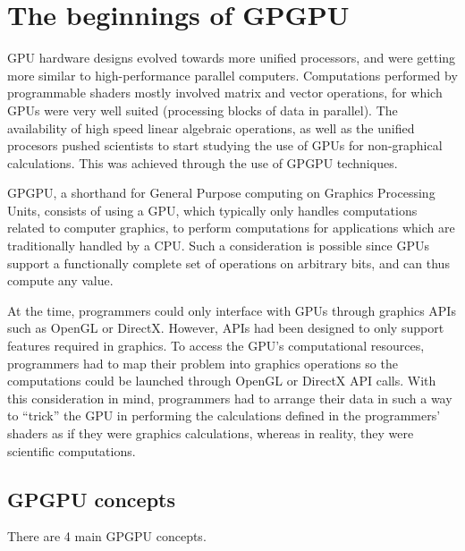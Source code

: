\documentclass[10pt, a4paper]{report}
\begin{document}
\section{The beginnings of GPGPU}
GPU hardware designs evolved towards more unified processors, and were getting
more similar to high-performance parallel computers.
Computations performed by programmable shaders mostly involved matrix and vector
operations, for which GPUs were very well suited (processing blocks of data in
parallel).
The availability of high speed linear algebraic operations, as well as the
unified procesors pushed scientists to start studying the use of GPUs for
non-graphical calculations.
This was achieved through the use of GPGPU techniques.

GPGPU, a shorthand for General Purpose computing on Graphics Processing Units,
consists of using a GPU, which typically only handles computations related to
computer graphics, to perform computations for applications which are
traditionally handled by a CPU.
Such a consideration is possible since GPUs support a functionally complete set
of operations on arbitrary bits, and can thus compute any value.

At the time, programmers could only interface with GPUs through graphics APIs
such as OpenGL or DirectX.
However, APIs had been designed to only support features required in graphics.
To access the GPU's computational resources, programmers had to map their
problem into graphics operations so the computations could be launched through
OpenGL or DirectX API calls.
With this consideration in mind, programmers had to arrange their data in such a
way to ``trick'' the GPU in performing the calculations defined in the
programmers' shaders as if they were graphics calculations, whereas in reality,
they were scientific computations.

\subsection{GPGPU concepts}
There are 4 main GPGPU concepts.
\end{document}
